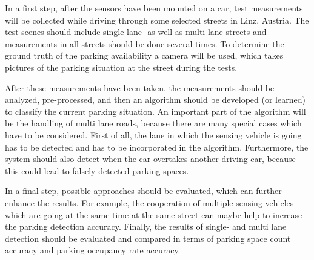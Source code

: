 \documentclass[11pt,a4paper,titlepage,
chapterprefix,headsepline,parskip,pdftex,
,pointlessnumbers,bibtotoc]{article}
\begin{document}
In a first step, after the sensors have been mounted on a car, test measurements will be collected while driving through some selected streets in Linz, Austria. The test scenes should include single lane- as well as multi lane streets and measurements in all streets should be done several times. To determine the ground truth of the parking availability a camera will be used, which takes pictures of the parking situation at the street during the tests.


After these measurements have been taken, the measurements should be analyzed, pre-processed, and then an algorithm should be developed (or learned) to classify the current parking situation. An important part of the algorithm will be the handling of multi lane roads, because there are many special cases which have to be considered. First of all, the lane in which the sensing vehicle is going has to be detected and has to be incorporated in the algorithm. Furthermore, the system should also detect when the car overtakes another driving car, because this could lead to falsely detected parking spaces.

In a final step, possible approaches should be evaluated, which can further enhance the results. For example, the cooperation of multiple sensing vehicles which are going at the same time at the same street can maybe help to increase the parking detection accuracy. Finally, the results of single- and multi lane detection should be evaluated and compared in terms of parking space count accuracy and parking occupancy rate accuracy. 



\end{document}
